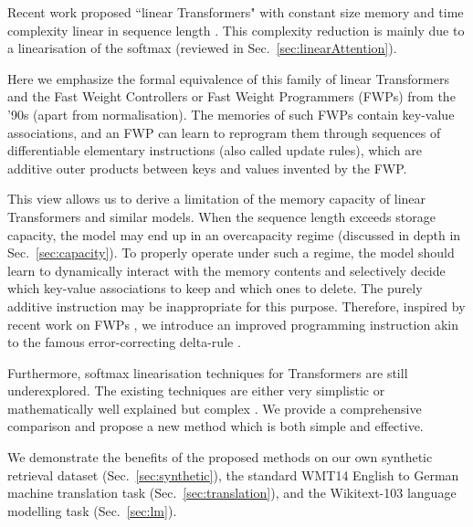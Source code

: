 \documentclass{article}
\theoremstyle{definition}
\begin{document}
Recent work proposed ``linear Transformers" with constant size memory and time
complexity linear in sequence length  \citep{katharopoulos2020transformers, choromanski2020rethinking, peng2021random, shen2018efficient}.
This complexity reduction is mainly due to 
 a linearisation of the softmax (reviewed in Sec.~\ref{sec:linearAttention}).

Here we emphasize the formal equivalence of this family of linear Transformers and the Fast Weight Controllers or Fast Weight Programmers (FWPs) 
from the '90s \citep{Schmidhuber:91fastweights, schmidhuber1992learning, schmidhuber1993reducing, schmidhuber2021fwp} (apart from normalisation). 
The memories of such FWPs contain key-value associations, and an FWP can learn to reprogram them through sequences of differentiable elementary instructions (also called update rules), which are additive outer products between keys and values invented by the FWP.

This view allows us to derive a limitation of the memory capacity of linear Transformers and similar models.
When the sequence length exceeds storage capacity, 
the model may end up in an overcapacity regime (discussed in depth in Sec.~\ref{sec:capacity}).
To properly operate under such a regime,
the model should learn to dynamically interact with the memory contents and selectively
decide which key-value associations to keep and which ones to delete.
The purely additive instruction may be inappropriate for this purpose.
Therefore, 
inspired by recent work on FWPs
\citep{schlag2020fastweightmemory}, we introduce an improved programming instruction
akin to the famous error-correcting delta-rule \citep{widrow1960adaptive}. 

Furthermore, softmax linearisation techniques for Transformers
are still underexplored.
The existing techniques are either very simplistic \citep{katharopoulos2020transformers}
or mathematically well explained but complex \mbox{\citep{choromanski2020rethinking, peng2021random}}.
We provide a comprehensive comparison and propose
a new method which is both simple and effective.

We demonstrate the benefits of the proposed methods on our own synthetic retrieval dataset (Sec.~\ref{sec:synthetic}), the standard WMT14 English to German machine translation task (Sec.~\ref{sec:translation}), and the Wikitext-103 \citep{merity2016pointer} language modelling task (Sec.~\ref{sec:lm})\footnotemark[2].
\end{document}
